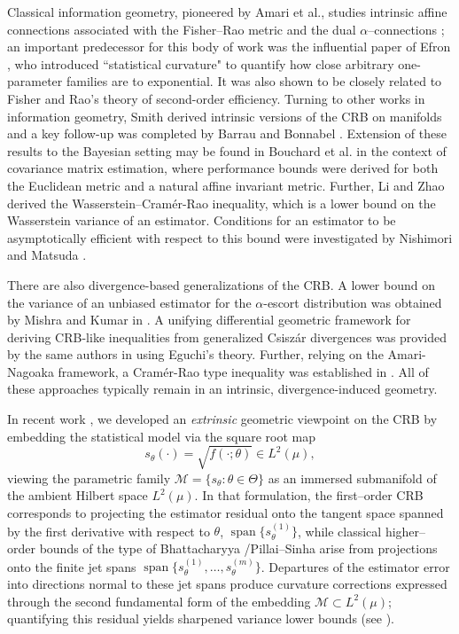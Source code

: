 \documentclass[3p,times]{elsarticle}
\begin{document}
Classical information geometry, pioneered by Amari et al., studies intrinsic affine
connections associated with the Fisher--Rao metric and the dual
$\alpha$--connections \cite{amari}; an important predecessor for this body of work was the influential paper of Efron \cite{efron1975}, who introduced ``statistical curvature" to quantify how close arbitrary one-parameter families are to exponential. It was also shown to be closely related to Fisher and Rao's theory of second-order efficiency. Turning to other works in information geometry, Smith \cite{smith_intrinsic_crb} derived intrinsic versions of the CRB on manifolds and a key follow-up was completed by Barrau and Bonnabel \cite{boumal2013_intrinsic_crb}. Extension of these results to the Bayesian setting may be found in Bouchard et al. \cite{bouchard2024} in the context of covariance matrix estimation, where performance bounds were derived for both the Euclidean metric and a natural affine invariant metric. 
Further, Li and Zhao \cite{Li} derived the Wasserstein--Cramér-Rao inequality, which is a lower bound on the Wasserstein variance of an estimator. Conditions for an estimator to be asymptotically efficient with respect to this bound were investigated by Nishimori and Matsuda \cite{nishimori2025}. 

There are also divergence-based generalizations of the CRB. A lower bound on the variance of an unbiased estimator for the $\alpha$-escort distribution was obtained by Mishra and Kumar in \cite{mishra2020}. A unifying differential geometric framework for deriving CRB-like inequalities from generalized Csiszár divergences was provided by the same authors in \cite{ashok2020} using Eguchi's theory. Further, relying on the Amari-Nagoaka framework, a Cramér-Rao type inequality was established in \cite{mishra2021}. All of these approaches typically remain in an intrinsic, divergence-induced geometry.

In recent work \cite{SRK,srkvector}, we developed an {\em extrinsic} geometric viewpoint
on the CRB by embedding the statistical model via the square root map
\[
s_\theta(\cdot)=\sqrt{f(\cdot;\theta)}\in L^2(\mu),
\]
viewing the parametric family 
\(\mathcal M=\{s_\theta:\theta\in\Theta\}\) as an immersed submanifold of the
ambient Hilbert space \(L^2(\mu)\).  
In that formulation, the first--order CRB corresponds to projecting the estimator
residual onto the tangent space spanned by the first derivative with respect to \(\theta\), $\operatorname{span}\{s_\theta^{(1)}\}$, while
classical higher--order bounds of the type of Bhattacharyya \cite{b1946}/Pillai--Sinha \cite{pillai} arise from projections onto the finite jet spans 
$\operatorname{span}\{s_\theta^{(1)},\dots,s_\theta^{(m)}\}$.  
Departures of the estimator error into directions normal to these jet spans
produce curvature corrections expressed through the second fundamental form of
the embedding $\mathcal M\subset L^2(\mu)$; quantifying this residual yields
sharpened variance lower bounds (see \cite{SRK,srkvector}).
\end{document}
